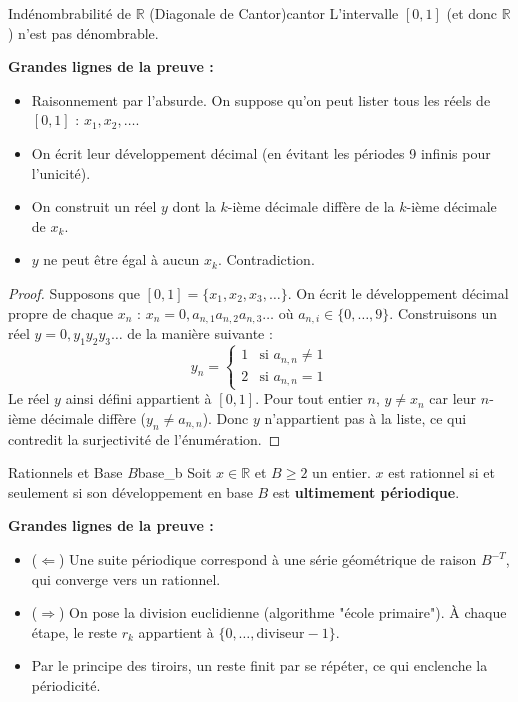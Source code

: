 \documentclass{prepacours}
\begin{document}
\begin{proposition}{Indénombrabilité de $\mathbb{R}$ (Diagonale de Cantor)}{cantor}
    L'intervalle $[0, 1]$ (et donc $\mathbb{R}$) n'est pas dénombrable.
\end{proposition}

\noindent \textbf{Grandes lignes de la preuve :}
\begin{itemize}
    \item Raisonnement par l'absurde. On suppose qu'on peut lister tous les réels de $[0,1]$ : $x_1, x_2, \dots$.
    \item On écrit leur développement décimal (en évitant les périodes 9 infinis pour l'unicité).
    \item On construit un réel $y$ dont la $k$-ième décimale diffère de la $k$-ième décimale de $x_k$.
    \item $y$ ne peut être égal à aucun $x_k$. Contradiction.
\end{itemize}

\begin{proof}
    Supposons que $[0, 1] = \{x_1, x_2, x_3, \dots\}$.
    On écrit le développement décimal propre de chaque $x_n$ :
    $x_n = 0, a_{n,1} a_{n,2} a_{n,3} \dots$ où $a_{n,i} \in \{0, \dots, 9\}$.
    Construisons un réel $y = 0, y_1 y_2 y_3 \dots$ de la manière suivante :
    \[
    y_n = \begin{cases}
    1 & \text{si } a_{n,n} \neq 1 \\
    2 & \text{si } a_{n,n} = 1
    \end{cases}
    \]
    Le réel $y$ ainsi défini appartient à $[0, 1]$.
    Pour tout entier $n$, $y \neq x_n$ car leur $n$-ième décimale diffère ($y_n \neq a_{n,n}$).
    Donc $y$ n'appartient pas à la liste, ce qui contredit la surjectivité de l'énumération.
\end{proof}

\begin{proposition}{Rationnels et Base $B$}{base_b}
    Soit $x \in \mathbb{R}$ et $B \ge 2$ un entier.
    $x$ est rationnel si et seulement si son développement en base $B$ est \textbf{ultimement périodique}.
\end{proposition}

\noindent \textbf{Grandes lignes de la preuve :}
\begin{itemize}
    \item ($\Longleftarrow$) Une suite périodique correspond à une série géométrique de raison $B^{-T}$, qui converge vers un rationnel.
    \item ($\Longrightarrow$) On pose la division euclidienne (algorithme "école primaire"). À chaque étape, le reste $r_k$ appartient à $\{0, \dots, \text{diviseur}-1\}$.
    \item Par le principe des tiroirs, un reste finit par se répéter, ce qui enclenche la périodicité.
\end{itemize}
\end{document}

